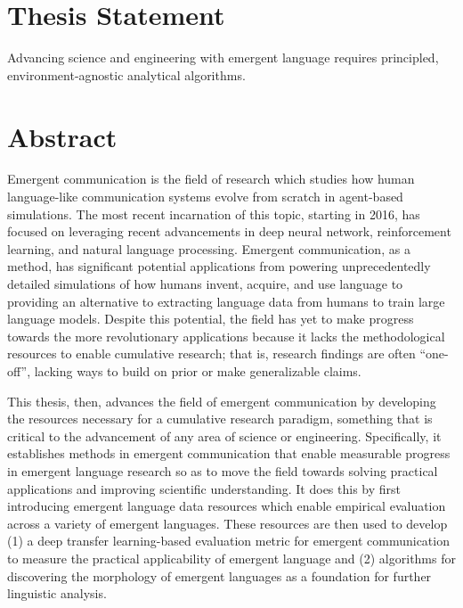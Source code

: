 \null\vfill

\section*{Thesis Statement}
Advancing science and engineering with emergent language requires principled, environment-agnostic analytical algorithms.

\section*{Abstract}
Emergent communication is the field of research which studies how human language-like communication systems evolve from scratch in agent-based simulations.
The most recent incarnation of this topic, starting in 2016, has focused on leveraging recent advancements in deep neural network, reinforcement learning, and natural language processing.
Emergent communication, as a method, has significant potential applications from powering unprecedentedly detailed simulations of how humans invent, acquire, and use language
  to providing an alternative to extracting language data from humans to train large language models.
Despite this potential, the field has yet to make progress towards the more revolutionary applications because it lacks the methodological resources to enable cumulative research;
  that is, research findings are often ``one-off'', lacking ways to build on prior or make generalizable claims.

This thesis, then, advances the field of emergent communication by developing the resources necessary for a cumulative research paradigm, something that is critical to the advancement of any area of science or engineering.
Specifically, it establishes methods in emergent communication that enable measurable progress in emergent language research so as to move the field towards solving practical applications and improving scientific understanding.
It does this by first introducing emergent language data resources which enable empirical evaluation across a variety of emergent languages.
These resources are then used to develop
  (1) a deep transfer learning-based evaluation metric for emergent communication to measure the practical applicability of emergent language
  and (2) algorithms for discovering the morphology of emergent languages as a foundation for further linguistic analysis.

\vfill
